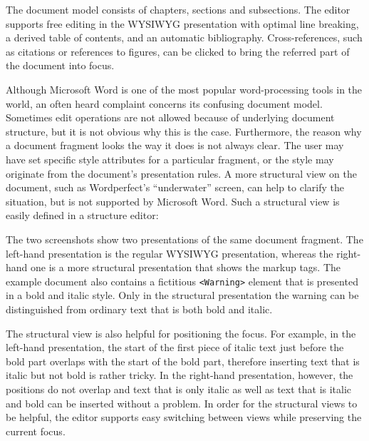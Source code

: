 The document model consists of chapters, sections and subsections. The editor supports free editing in the WYSIWYG presentation with optimal line breaking, a derived table of contents, and an automatic bibliography. Cross-references, such as citations or references to figures, can be clicked to bring the referred part of the document into focus.


Although Microsoft Word is one of the most popular word-processing tools in the world, an often heard complaint concerns its confusing document model. Sometimes edit operations are not allowed because of underlying document structure, but it is not obvious why this is the case. Furthermore, the reason why a document fragment looks the way it does is not always clear. The user may have set specific style attributes for a particular fragment, or the style may originate from the document's presentation rules. A more structural view on the document, such as Wordperfect's ``underwater'' screen, can help to clarify the situation, but is not supported by Microsoft Word. Such a structural view is easily defined in a structure editor:


The two screenshots show two presentations of the same document fragment. The left-hand presentation is the regular WYSIWYG presentation, whereas the right-hand one is a more structural presentation that shows the markup tags. The example document also contains a fictitious \verb|<Warning>| element that is presented in a bold and italic style. Only in the structural  presentation the warning can be distinguished from ordinary text that is both bold and italic.

The structural view is also helpful for positioning the focus. For example, in the left-hand presentation, the start of the first piece of italic text just before the bold part overlaps with the start of the bold part, therefore inserting text that is italic but not bold is rather tricky. In the right-hand presentation, however, the positions do not overlap and text that is only italic as well as text that is italic and bold can be inserted without a problem. In order for the structural views to be helpful, the editor supports easy switching between views while preserving the current focus.

